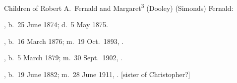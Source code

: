 \begin{KidsIntro}
	Children of Robert A.\ Fernald and Margaret\textsuperscript{3} (Dooley) (Simonds) Fernald:
\end{KidsIntro}	

\begin{Kids}
	
	, b.\ 25 June 1874;\cite{Anna4FernaldBirth} d.\ 5 May 1875.\cite{Anna4FernaldDeath}
	
	, b.\ 16 March 1876; m.\ 19 Oct.\ 1893, .
		
	, b.\ 5 March 1879; m.\ 30 Sept.\ 1902, .
	
	, b.\ 19 June 1882; m.\ 28 June 1911, . [sister of Christopher?]
	
\end{Kids}
	
	
